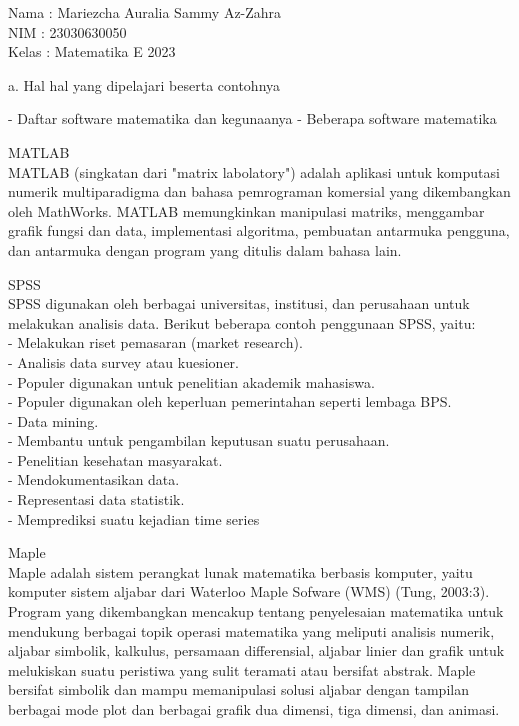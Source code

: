 \documentclass[a4paper,10pt]{article}
\begin{document}
\begin{eulernotebook}
\begin{eulercomment}
Nama  : Mariezcha Auralia Sammy Az-Zahra\\
NIM   : 23030630050\\
Kelas : Matematika E 2023

\end{eulercomment}
\eulersubheading{}
\begin{eulercomment}
a. Hal hal yang dipelajari beserta contohnya\\
\end{eulercomment}
\begin{eulerttcomment}
   - Daftar software matematika dan kegunaanya
   - Beberapa software matematika
\end{eulerttcomment}
\begin{eulercomment}
MATLAB\\
MATLAB (singkatan dari "matrix labolatory") adalah aplikasi untuk
komputasi numerik multiparadigma dan bahasa pemrograman komersial yang
dikembangkan oleh MathWorks. MATLAB memungkinkan manipulasi matriks,
menggambar grafik fungsi dan data, implementasi algoritma, pembuatan
antarmuka pengguna, dan antarmuka dengan program yang ditulis dalam
bahasa lain.

SPSS\\
SPSS digunakan oleh berbagai universitas, institusi, dan perusahaan
untuk melakukan analisis data. Berikut beberapa contoh penggunaan
SPSS, yaitu:\\
- Melakukan riset pemasaran (market research).\\
- Analisis data survey atau kuesioner.\\
- Populer digunakan untuk penelitian akademik mahasiswa.\\
- Populer digunakan oleh keperluan pemerintahan seperti lembaga BPS.\\
- Data mining.\\
- Membantu untuk pengambilan keputusan suatu perusahaan.\\
- Penelitian kesehatan masyarakat.\\
- Mendokumentasikan data.\\
- Representasi data statistik.\\
- Memprediksi suatu kejadian time series

Maple\\
Maple adalah sistem perangkat lunak matematika berbasis komputer,
yaitu komputer sistem aljabar dari Waterloo Maple Sofware (WMS) (Tung,
2003:3). Program yang dikembangkan mencakup tentang penyelesaian
matematika untuk mendukung berbagai topik operasi matematika yang
meliputi analisis numerik, aljabar simbolik, kalkulus, persamaan
differensial, aljabar linier dan grafik untuk melukiskan suatu
peristiwa yang sulit teramati atau bersifat abstrak. Maple bersifat
simbolik dan mampu memanipulasi solusi aljabar dengan tampilan
berbagai mode plot dan berbagai grafik dua dimensi, tiga dimensi, dan
animasi.


\end{eulercomment}
\end{eulernotebook}
\end{document}
